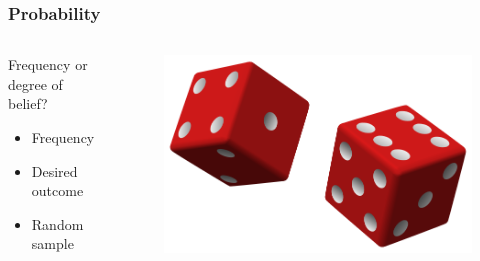 \documentclass[10pt, compress]{beamer}
\begin{document}
\begin{frame}
    \frametitle{Probability}
    \begin{columns}
        \begin{block}{Frequency or degree of belief?}
            \begin{itemize}
                \item Frequency
                \item Desired outcome
                \item Random sample
            \end{itemize}
        \end{block}
        \begin{block}{}
            \begin{figure}
                \begin{center}
                    \includegraphics[scale=0.2]{img/GRE_Probability.png}
                \end{center}
            \end{figure}
        \end{block}
    \end{columns}
\end{frame}
\end{document}
